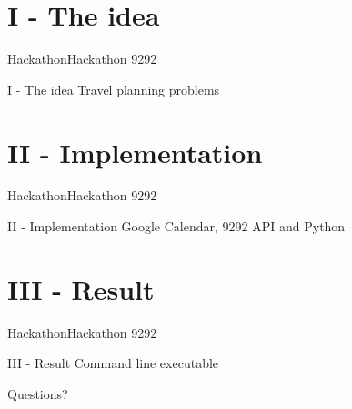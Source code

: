 \documentclass[14pt,aspectratio=169]{beamer}
\author{Nick van Bakel, Rick van der Heide \& Tim Vlaar}
\title{\TT}
\institute{Hogeschool van Amsterdam}
\date{20 september 2019}
\newcommand{\TT}{Hackathon 9292}
\newcommand{\TB}{Hackathon}
\newcommand{\DT}{I - The idea}
\newcommand{\IN}{II - Implementation}
\newcommand{\PI}{III - Result}
\begin{document}
\begin{frame}
\titlepage
\end{frame}

\section{\DT}
\begin{frame}{\TB}{\TT}
 \begin{block}{\DT}
Travel planning problems
 \end{block}
\end{frame}

\section{\IN}
\begin{frame}{\TB}{\TT}
 \begin{block}{\IN}
Google Calendar, 9292 API and Python
 \end{block}
\end{frame}

\section{\PI}
\begin{frame}{\TB}{\TT}
 \begin{block}{\PI}
Command line executable
 \end{block}
\end{frame}

\small
\begin{frame}
  \begin{center}
  Questions?
  \end{center}
\end{frame}
\end{document}
